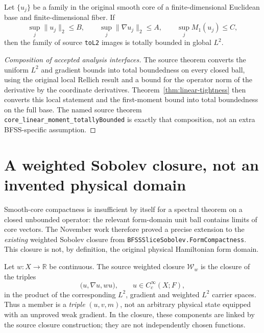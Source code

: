 \begin{theorem}\label{thm:core-moment}
Let \(\{u_j\}\) be a family in the original smooth core of a
finite-dimensional Euclidean base and finite-dimensional fiber. If
\begin{equation}\label{eq:core-uniform-bounds}
 \sup_j\|u_j\|_{2}\le B,\qquad
 \sup_j\|\nabla u_j\|_2\le A,\qquad
 \sup_j M_1(u_j)\le C,
\end{equation}
then the family of source \texttt{toL2} images is totally bounded in
global \(L^2\).
\end{theorem}
\begin{proof}[Composition of accepted analysis interfaces]
The source theorem
 converts the
uniform \(L^2\) and gradient bounds into total boundedness on every
closed ball, using the original local Rellich result and a bound for
the operator norm of the derivative by the coordinate derivatives.
Theorem~\ref{thm:linear-tightness} then converts this local statement
and the first-moment bound into total boundedness on the full base.
The named source theorem
\texttt{core\_linear\_moment\_totallyBounded} is exactly that
composition, not an extra BFSS-specific assumption.
\end{proof}

\section{A weighted Sobolev closure, not an invented physical domain}
Smooth-core compactness is insufficient by itself for a spectral
theorem on a closed unbounded operator: the relevant form-domain unit
ball contains limits of core vectors. The November work therefore
proved a precise extension to the \emph{existing} weighted Sobolev
closure from \texttt{BFSSSliceSobolev.FormCompactness}. This closure
is not, by definition, the original physical Hamiltonian form domain.

Let \(w:X\to\mathbb R\) be continuous. The source weighted closure
\(\mathcal W_w\) is the closure of the triples
\begin{equation}\label{eq:weighted-triple}
 \bigl(u,\nabla u,wu\bigr),\qquad u\in C_c^\infty(X;F),
\end{equation}
in the product of the corresponding \(L^2\), gradient and weighted
\(L^2\) carrier spaces. Thus a member is a \emph{triple}
\((u,v,m)\), not an arbitrary physical state equipped with an
unproved weak gradient. In the closure, these components are linked
by the source closure construction; they are not independently chosen
functions.

